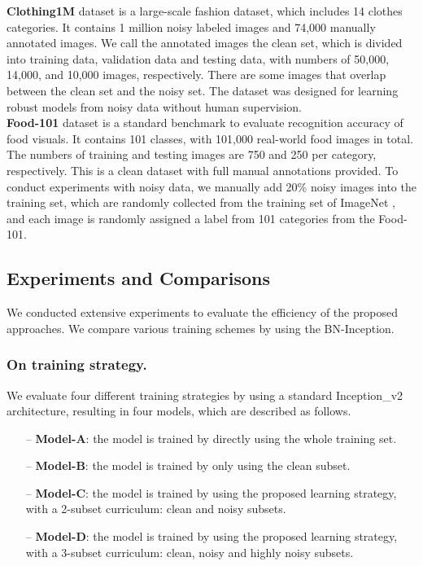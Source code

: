 \documentclass[runningheads]{llncs}
\begin{document}
\noindent \textbf{Clothing1M} dataset \cite{xiao2015learning} is a large-scale fashion dataset, which includes 14 clothes categories. It contains 1 million noisy labeled images and 74,000 manually annotated images. We call the annotated images the clean set, which is divided into training data, validation data and testing data, with numbers of 50,000, 14,000, and 10,000 images, respectively. There are some images that overlap between the clean set and the noisy set. The dataset was designed for learning robust models from noisy data without human supervision.\\

\noindent \textbf{Food-101} dataset \cite{bossard2014food} is a standard benchmark to evaluate recognition accuracy of food visuals. It contains 101 classes, with 101,000 real-world food images in total. The numbers of training and testing images are 750 and 250 per category, respectively. This is a clean dataset with full manual annotations provided. To conduct experiments with noisy data, we manually add 20\% noisy images into the training set, which are randomly collected from the training set of ImageNet \cite{DengDSLL009}, and each image is randomly assigned a label from 101 categories from the Food-101.

\subsection{Experiments and Comparisons}
We conducted extensive experiments to evaluate the efficiency of the proposed approaches. We compare various training schemes by using the BN-Inception. 


\subsubsection{On training strategy.}
 We evaluate four different training strategies by using a standard Inception\_v2 architecture, resulting in four models, which are described as follows.
\begin{itemize}
\item[--] \textbf{Model-A}: the model is trained by directly using the whole training set.
\item[--] \textbf{Model-B}: the model is trained by only using the clean subset.
\item[--] \textbf{Model-C}: the model is trained by using the proposed learning strategy, with a 2-subset curriculum: clean and noisy subsets.
\item[--] \textbf{Model-D}: the model is trained by using the proposed learning strategy, with a 3-subset curriculum: clean, noisy and highly noisy subsets.
\end{itemize}
\end{document}
